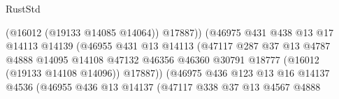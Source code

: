 \begin{lexlean}{RustStd}
\begin{coremodule}
                                                  (@16012 (@19133 @14085 @14064))
                                                  @17887))
                                              (@46975
                                                @431
                                                @438
                                                @13
                                                @17
                                                @14113
                                                @14139
                                                (@46955
                                                  @431
                                                  @13
                                                  @14113
                                                  (@47117
                                                    @287
                                                    @37
                                                    @13
                                                    @4787
                                                    @4888
                                                    @14095
                                                    @14108
                                                    @47132
                                                    @46356
                                                    @46360
                                                    @30791
                                                    @18777
                                                    (@16012 (@19133 @14108 @14096))
                                                    @17887))
                                                (@46975
                                                  @436
                                                  @123
                                                  @13
                                                  @16
                                                  @14137
                                                  @4536
                                                  (@46955
                                                    @436
                                                    @13
                                                    @14137
                                                    (@47117
                                                      @338
                                                      @37
                                                      @13
                                                      @4567
                                                      @4888

\end{coremodule}
\end{lexlean}
